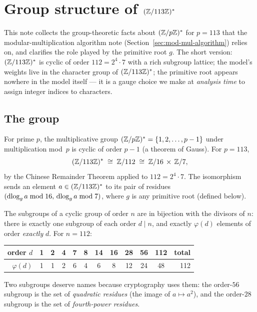 \section{Group structure of \texorpdfstring{$(\mathbb{Z}/113\mathbb{Z})^*$}{(Z/113Z)*}}
\label{sec:group-structure}

This note collects the group-theoretic facts about $(\mathbb{Z}/p\mathbb{Z})^*$ for $p=113$
that the modular-multiplication algorithm note
(Section~\ref{sec:mod-mul-algorithm}) relies on, and clarifies the role
played by the primitive root $g$.  The short version: $(\mathbb{Z}/113\mathbb{Z})^*$ is
cyclic of order $112 = 2^4 \cdot 7$ with a rich subgroup lattice; the model's
weights live in the character group of $(\mathbb{Z}/113\mathbb{Z})^*$; the primitive root
appears nowhere in the model itself --- it is a gauge choice we make at
\emph{analysis time} to assign integer indices to characters.

\subsection{The group}
\label{subsec:group}

For prime $p$, the multiplicative group $(\mathbb{Z}/p\mathbb{Z})^* = \{1, 2, \ldots, p-1\}$
under multiplication mod~$p$ is cyclic of order $p-1$ (a theorem of Gauss).
For $p = 113$,
\begin{equation}
  (\mathbb{Z}/113\mathbb{Z})^* \;\cong\; \mathbb{Z}/112 \;\cong\; \mathbb{Z}/16 \,\times\, \mathbb{Z}/7,
  \label{eq:113-crt}
\end{equation}
by the Chinese Remainder Theorem applied to $112 = 2^4 \cdot 7$.  The
isomorphism sends an element $a \in (\mathbb{Z}/113\mathbb{Z})^*$ to its pair of residues
$(\operatorname{dlog}_g a \bmod 16,\, \operatorname{dlog}_g a \bmod 7)$, where $g$ is any primitive root
(defined below).

The subgroups of a cyclic group of order $n$ are in bijection with the
divisors of $n$: there is exactly one subgroup of each order $d \mid n$, and
exactly $\varphi(d)$ elements of order \emph{exactly} $d$.  For $n = 112$:

\begin{center}
\begin{tabular}{r|cccccccccc|r}
  order $d$        & 1 & 2 & 4 & 7 & 8 & 14 & 16 & 28 & 56 & 112 & total \\
  \hline
  $\varphi(d)$     & 1 & 1 & 2 & 6 & 4 & 6  & 8  & 12 & 24 & 48  & 112 \\
\end{tabular}
\end{center}

\noindent Two subgroups deserve names because cryptography uses them:
the order-$56$ subgroup is the set of \emph{quadratic residues} (the image
of $a \mapsto a^2$), and the order-$28$ subgroup is the set of
\emph{fourth-power residues}.

